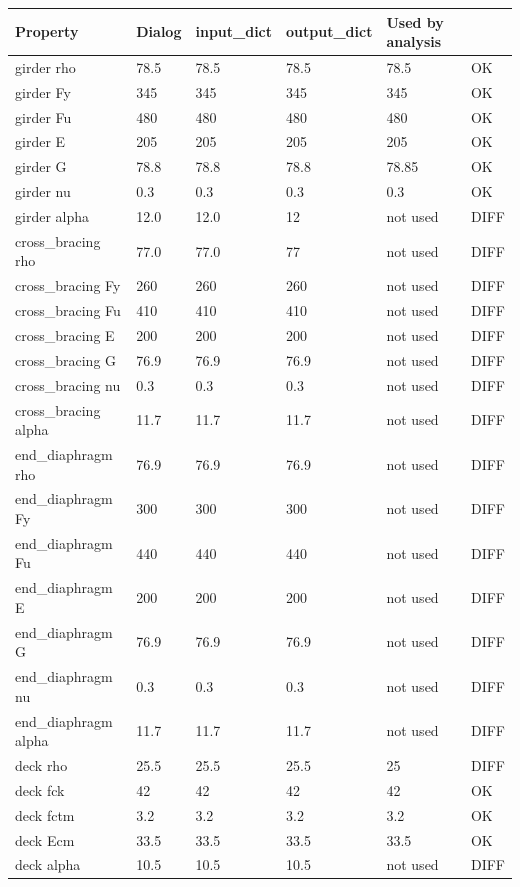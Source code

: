 \begin{tabular}{@{}llllll@{}}
\toprule
\textbf{Property} & \textbf{Dialog} & \textbf{input\_dict} & \textbf{output\_dict} & \textbf{Used by analysis} & \textbf{} \\
\midrule
girder rho & 78.5 & 78.5 & 78.5 & 78.5 & OK \\
girder Fy & 345 & 345 & 345 & 345 & OK \\
girder Fu & 480 & 480 & 480 & 480 & OK \\
girder E & 205 & 205 & 205 & 205 & OK \\
girder G & 78.8 & 78.8 & 78.8 & 78.85 & OK \\
girder nu & 0.3 & 0.3 & 0.3 & 0.3 & OK \\
girder alpha & 12.0 & 12.0 & 12 & not used & DIFF \\
cross\_bracing rho & 77.0 & 77.0 & 77 & not used & DIFF \\
cross\_bracing Fy & 260 & 260 & 260 & not used & DIFF \\
cross\_bracing Fu & 410 & 410 & 410 & not used & DIFF \\
cross\_bracing E & 200 & 200 & 200 & not used & DIFF \\
cross\_bracing G & 76.9 & 76.9 & 76.9 & not used & DIFF \\
cross\_bracing nu & 0.3 & 0.3 & 0.3 & not used & DIFF \\
cross\_bracing alpha & 11.7 & 11.7 & 11.7 & not used & DIFF \\
end\_diaphragm rho & 76.9 & 76.9 & 76.9 & not used & DIFF \\
end\_diaphragm Fy & 300 & 300 & 300 & not used & DIFF \\
end\_diaphragm Fu & 440 & 440 & 440 & not used & DIFF \\
end\_diaphragm E & 200 & 200 & 200 & not used & DIFF \\
end\_diaphragm G & 76.9 & 76.9 & 76.9 & not used & DIFF \\
end\_diaphragm nu & 0.3 & 0.3 & 0.3 & not used & DIFF \\
end\_diaphragm alpha & 11.7 & 11.7 & 11.7 & not used & DIFF \\
deck rho & 25.5 & 25.5 & 25.5 & 25 & DIFF \\
deck fck & 42 & 42 & 42 & 42 & OK \\
deck fctm & 3.2 & 3.2 & 3.2 & 3.2 & OK \\
deck Ecm & 33.5 & 33.5 & 33.5 & 33.5 & OK \\
deck alpha & 10.5 & 10.5 & 10.5 & not used & DIFF \\
\bottomrule
\end{tabular}
